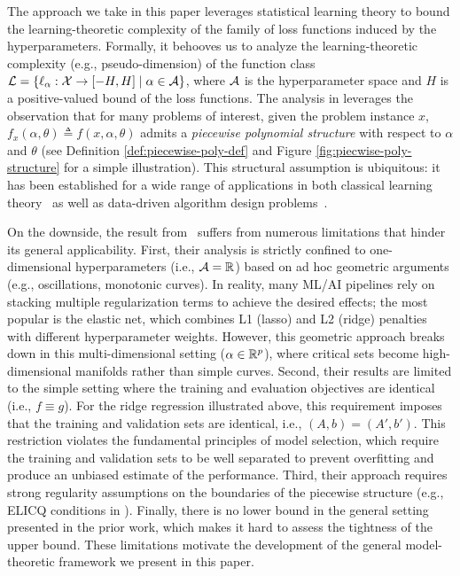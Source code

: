 \documentclass{article}
\theoremstyle{plain}
\theoremstyle{definition}
\theoremstyle{remark}
\begin{document}
The approach we take in this paper leverages statistical learning theory to bound the learning-theoretic complexity of the family of loss functions induced by the hyperparameters. Formally, it behooves us to analyze the learning-theoretic complexity (e.g., pseudo-dimension) of the function class $\mathcal{L} = \{\ell_\alpha: \mathcal{X} \rightarrow [-H, H] \mid \alpha \in \mathcal{A}\}$, where $\mathcal{A}$ is the hyperparameter space and $H$ is a positive-valued bound of the loss functions. The analysis in \citet{balcan2025sample} leverages the observation that for many problems of interest, given the problem instance $x$, $f_x(\alpha, \theta) \triangleq f(x, \alpha, \theta)$ admits a \textit{piecewise polynomial structure} with respect to $\alpha$ and $\theta$ (see Definition \ref{def:piecewise-poly-def} and Figure \ref{fig:piecwise-poly-structure} for a simple illustration). This structural assumption is ubiquitous: it has been established for a wide range of applications in both classical learning theory~\citep{bartlett1998almost,montufar2014number,bartlett2019nearly} as well as data-driven algorithm design problems~\citep{balcan2021much,balcan2023new,nguyen2026provably,cheng2025generalization}. 

On the downside, the result from~\citet{balcan2025sample} suffers from numerous limitations that hinder its general applicability. First, their analysis is strictly confined to one-dimensional hyperparameters (i.e., $\mathcal{A} = \mathbb{R}$) based on ad hoc geometric arguments (e.g., oscillations, monotonic curves). In reality, many ML/AI pipelines rely on stacking multiple regularization terms to achieve the desired effects; the most popular is the elastic net, which combines L1 (lasso) and L2 (ridge) penalties with different hyperparameter weights. However, this geometric approach breaks down in this multi-dimensional setting ($\alpha \in \mathbb{R}^p$), where critical sets become high-dimensional manifolds rather than simple curves. Second, their results are limited to the simple setting where the training and evaluation objectives are identical (i.e., $f \equiv g$). For the ridge regression illustrated above, this requirement imposes that the training and validation sets are identical, i.e., $(A, b) = (A', b')$. This restriction violates the fundamental principles of model selection, which require the training and validation sets to be well separated to prevent overfitting and produce an unbiased estimate of the performance.
Third, their approach requires strong regularity assumptions on the boundaries of the piecewise structure (e.g., ELICQ conditions in \citet[Assumption 1]{balcan2025sample}). Finally, there is no lower bound in the general setting presented in the prior work, which makes it hard to assess the tightness of the upper bound. These limitations motivate the development of the general model-theoretic framework we present in this paper.  
\end{document}
